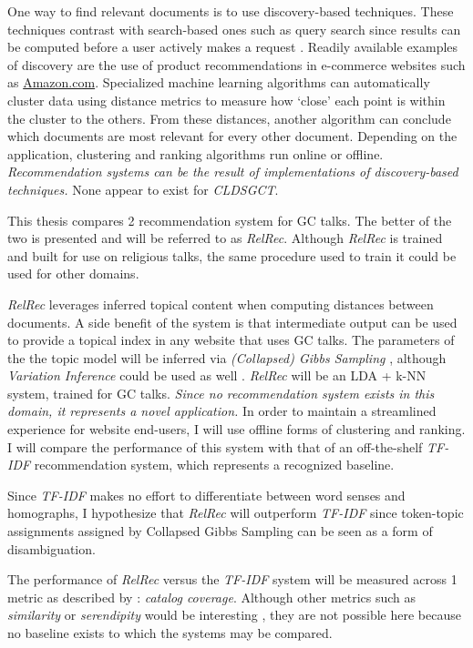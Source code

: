 One way to find relevant documents is to use discovery-based techniques. These techniques contrast with search-based ones such as query search since results can be computed before a user actively makes a request \citep{todo}. Readily available examples of discovery are the use of product recommendations in e-commerce websites such as \url{Amazon.com}. Specialized machine learning algorithms can automatically cluster data using distance metrics to measure how `close' each point is within the cluster to the others. From these distances, another algorithm can conclude which documents are most relevant for every other document. Depending on the application, clustering and ranking algorithms run online or offline. \textit{Recommendation systems can be the result of implementations of discovery-based techniques.} None appear to exist for \emph{CLDSGCT}.

This thesis compares 2 recommendation system for GC talks. The better of the two is presented and will be referred to as \emph{RelRec}. Although \emph{RelRec} is trained and built for use on religious talks, the same procedure used to train it could be used for other domains.

\emph{RelRec} leverages inferred topical content when computing distances between documents. A side benefit of the system is that intermediate output can be used to provide a topical index in any website that uses GC talks. The parameters of the the topic model will be inferred via \emph{(Collapsed) Gibbs Sampling} \citep{Porteous:2008:FCG:1401890.1401960}, although \emph{Variation Inference} could be used as well \citep{blei2006variational}. \emph{RelRec} will be an LDA + k-NN system, trained for GC talks. \textit{Since no recommendation system exists in this domain, it represents a novel application.} In order to maintain a streamlined experience for website end-users, I will use offline forms of clustering and ranking. I will compare the performance of this system with that of an off-the-shelf \emph{TF-IDF} recommendation system, which represents a recognized baseline.

Since \emph{TF-IDF} makes no effort to differentiate between word senses and homographs, I hypothesize that \emph{RelRec} will outperform \emph{TF-IDF} since token-topic assignments assigned by Collapsed Gibbs Sampling can be seen as a form of disambiguation.

The performance of \emph{RelRec} versus the \emph{TF-IDF} system will be measured across 1 metric as described by \cite{Ge:2010:BAE:1864708.1864761}: \emph{catalog coverage}. Although other metrics such as \emph{similarity} or \emph{serendipity} would be interesting \citep{Ge:2010:BAE:1864708.1864761}, they are not possible here because no baseline exists to which the systems may be compared. %


